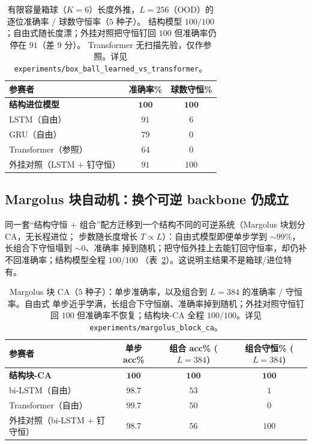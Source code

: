 \documentclass[11pt]{article}
\theoremstyle{definition}
\theoremstyle{plain}
\begin{document}
\begin{table}[h]
\centering
\caption{有限容量箱球（$K=6$）长度外推，$L=256$（OOD）的逐位准确率 / 球数守恒率（$5$ 种子）。
结构模型 $100/100$；自由式随长度漂；外挂对照把守恒钉回 $100$ 但准确率仍停在 $91$（差 $9$ 分）。
Transformer 无扫描先验，仅作参照。详见 \texttt{experiments/box\_ball\_learned\_vs\_transformer}。}
\label{tab:boxball}
\begin{tabular}{lcc}
\toprule
\textbf{参赛者} & \textbf{准确率\%} & \textbf{球数守恒\%} \\
\midrule
\textbf{结构进位模型} & $\mathbf{100}$ & $\mathbf{100}$ \\
LSTM（自由） & $91$ & $6$ \\
GRU（自由） & $79$ & $0$ \\
Transformer（参照） & $64$ & $0$ \\
外挂对照（LSTM $+$ 钉守恒） & $91$ & $100$ \\
\bottomrule
\end{tabular}
\end{table}

\subsection{Margolus 块自动机：换个可逆 backbone 仍成立}\label{sec:support:margolus}
同一套“结构守恒 $+$ 组合”配方迁移到一个结构不同的可逆系统（Margolus 块划分 CA，无长程进位；
步数随长度增长 $T\propto L$）：自由式模型即便单步学到 $\sim99\%$，长组合下守恒塌到 $\sim0$、准确率
掉到随机；把守恒外挂上去能钉回守恒率，却仍补不回准确率；结构模型全程 $100/100$
（表~\ref{tab:margolus}）。这说明主结果不是箱球/进位特有。

\begin{table}[h]
\centering
\caption{Margolus 块 CA（$5$ 种子）：单步准确率，以及组合到 $L=384$ 的准确率 / 守恒率。自由式
单步近乎学满，长组合下守恒崩、准确率掉到随机；外挂对照守恒钉回 $100$ 但准确率不恢复；结构块-CA
全程 $100/100$。详见 \texttt{experiments/margolus\_block\_ca}。}
\label{tab:margolus}
\begin{tabular}{lccc}
\toprule
\textbf{参赛者} & \textbf{单步 acc\%} & \textbf{组合 acc\% ($L{=}384$)} & \textbf{组合守恒\% ($L{=}384$)} \\
\midrule
\textbf{结构块-CA} & $\mathbf{100}$ & $\mathbf{100}$ & $\mathbf{100}$ \\
bi-LSTM（自由） & $98.7$ & $53$ & $1$ \\
Transformer（自由） & $99.7$ & $50$ & $0$ \\
外挂对照（bi-LSTM $+$ 钉守恒） & $98.7$ & $56$ & $100$ \\
\bottomrule
\end{tabular}
\end{table}
\end{document}
